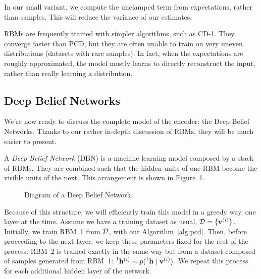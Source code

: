 In our small variant, we compute the unclamped term from expectations, rather
than samples. This will reduce the variance of our estimates.

RBMs are frequently trained with simpler algorithms, such as CD-1. They
converge faster than PCD, but they are often unable to train on very uneven
distributions (datasets with rare samples). In fact, when the expectations are
roughly approximated, the model mostly learns to directly reconstruct the
input, rather than really learning a distribution.


\subsection{Deep Belief Networks}

\label{sec:dbn}

We're now ready to discuss the complete model of the encoder: the Deep Belief
Networks. Thanks to our rather in-depth discussion of RBMs, they will be much
easier to present.

A \emph{Deep Belief Network} (DBN) is a
machine learning model composed by a stack of RBMs. They are combined such
that the hidden units of one RBM become the visible units of the next. This
arrangement is shown in Figure~\ref{fig:dbn}.
\begin{figure}
	\centering
	\caption{Diagram of a Deep Belief Network.}
	\label{fig:dbn}
\end{figure}
Because of this structure, we will efficiently train this model in a greedy
way, one layer at the time. Assume we have a training dataset as usual,
$\mathcal{D} = \{\mathbf{v}^{(i)}\}$. Initially, we train RBM~1 from $\mathcal{D}$,
with our Algorithm~\ref{alg:pcd}. Then, before proceeding to the next layer,
we keep these parameters fixed for the rest of the process. RBM~2 is trained
exactly in the same way but from a dataset composed of samples generated from
RBM~1: $\prescript{1}{}{\mathbf{h}}^{(i)} \sim p(\prescript{1}{}{\mathbf{h}} \mid
\mathbf{v}^{(i)})$. We repeat this process for each additional hidden layer of the
network.

